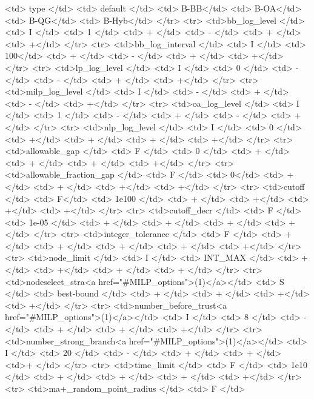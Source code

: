 {\begin{rawhtml}
    <td> type </td>
    <td> default </td>
    <td> B-BB</td>
    <td> B-OA</td>
    <td> B-QG</td>
    <td> B-Hyb</td>
  </tr>
  <tr>
    <td>bb_log_level </td>
    <td> I </td>
    <td> 1 </td>
    <td> + </td>
    <td> - </td>
    <td> + </td>
    <td> +</td>
  </tr>
  <tr>
    <td>bb_log_interval </td>
    <td> I </td>
    <td> 100</td>
    <td> + </td>
    <td> - </td>
    <td> + </td>
    <td> +</td>
  </tr>
  <tr>
    <td>lp_log_level </td>
    <td> I </td>
    <td> 0 </td>
    <td> - </td>
    <td> - </td>
    <td> + </td>
    <td> +</td>
  </tr>
  <tr>
    <td>milp_log_level </td>
    <td> I </td>
    <td> - </td>
    <td> + </td>
    <td> - </td>
    <td> +</td>
  </tr>
  <tr>
    <td>oa_log_level </td>
    <td> I </td>
    <td> 1 </td>
    <td> - </td>
    <td> + </td>
    <td> - </td>
    <td> +</td>
  </tr>
  <tr>
    <td>nlp_log_level </td>
    <td> I </td>
    <td> 0 </td>
    <td> +</td>
    <td> + </td>
    <td> + </td>
    <td> +</td>
  </tr>
  <tr>
    <td>allowable_gap </td>
    <td> F </td>
    <td> 0 </td>
    <td> + </td>
    <td> + </td>
    <td> + </td>
    <td> +</td>
  </tr>
  <tr>
    <td>allowable_fraction_gap </td>
    <td> F </td>
    <td> 0</td>
    <td> +</td>
    <td> + </td>
    <td> +</td>
    <td> +</td>
  </tr>
  <tr>
    <td>cutoff </td>
    <td> F</td>
    <td> 1e100 </td>
    <td> + </td>
    <td> +</td>
    <td> +</td>
    <td> +</td>
  </tr>
  <tr>
    <td>cutoff_decr </td>
    <td> F </td>
    <td> 1e-05 </td>
    <td> + </td>
    <td> + </td>
    <td> + </td>
    <td> +</td>
  </tr>
  <tr>
    <td>integer_tolerance </td>
    <td> F </td>
    <td> + </td>
    <td> + </td>
    <td> + </td>
    <td> + </td>
    <td> +</td>
  </tr>
  <tr>
    <td>node_limit </td>
    <td> I </td>
    <td> INT_MAX </td>
    <td> + </td>
    <td> +</td>
    <td> + </td>
    <td> + </td>
  </tr>
  <tr>
    <td>nodeselect_stra<a href="#MILP_options">(1)</a></td>
    <td> S </td>
    <td> best-bound </td>
    <td> + </td>
    <td> + </td>
    <td> +</td>
    <td> +</td>
  </tr>
  <tr>
    <td>number_before_trust<a href="#MILP_options">(1)</a></td>
    <td> I </td>
    <td> 8 </td>
    <td> - </td>
    <td> + </td>
    <td> + </td>
    <td> +</td>
  </tr>
  <tr>
    <td>number_strong_branch<a href="#MILP_options">(1)</a></td>
    <td> I </td>
    <td> 20 </td>
    <td> - </td>
    <td> + </td>
    <td> + </td>
    <td>+ </td>
  </tr>
  <tr>
    <td>time_limit </td>
    <td> F </td>
    <td> 1e10 </td>
    <td> + </td>
    <td> + </td>
    <td> + </td>
    <td> +</td>
  </tr>
  <tr>
    <td>ma+_random_point_radius </td>
    <td> F </td>

\end{rawhtml}}
